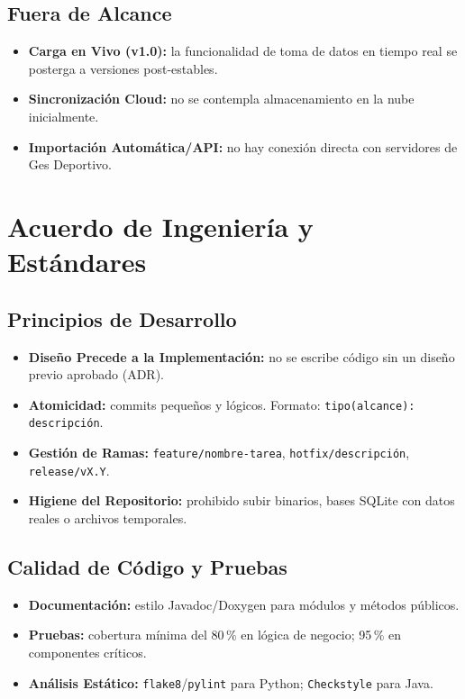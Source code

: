 \documentclass[11pt,a4paper]{article}
\newcommand{\fpath}[1]{\texttt{\small #1}}
\begin{document}
\subsection{Fuera de Alcance}
\begin{itemize}[nosep]
  \item \textbf{Carga en Vivo (v1.0):} la funcionalidad de toma de datos en tiempo real se posterga a versiones post-estables.
  \item \textbf{Sincronización Cloud:} no se contempla almacenamiento en la nube inicialmente.
  \item \textbf{Importación Automática/API:} no hay conexión directa con servidores de Ges Deportivo.
\end{itemize}

\section{Acuerdo de Ingeniería y Estándares}

\subsection{Principios de Desarrollo}
\begin{itemize}[nosep]
  \item \textbf{Diseño Precede a la Implementación:} no se escribe código sin un diseño previo aprobado (ADR).
  \item \textbf{Atomicidad:} commits pequeños y lógicos. Formato: \fpath{tipo(alcance): descripción}.
  \item \textbf{Gestión de Ramas:} \fpath{feature/nombre-tarea}, \fpath{hotfix/descripción}, \fpath{release/vX.Y}.
  \item \textbf{Higiene del Repositorio:} prohibido subir binarios, bases SQLite con datos reales o archivos temporales.
\end{itemize}

\subsection{Calidad de Código y Pruebas}
\begin{itemize}[nosep]
  \item \textbf{Documentación:} estilo Javadoc/Doxygen para módulos y métodos públicos.
  \item \textbf{Pruebas:} cobertura mínima del 80\,\% en lógica de negocio; 95\,\% en componentes críticos.
  \item \textbf{Análisis Estático:} \fpath{flake8}/\fpath{pylint} para Python; \fpath{Checkstyle} para Java.
\end{itemize}
\end{document}
